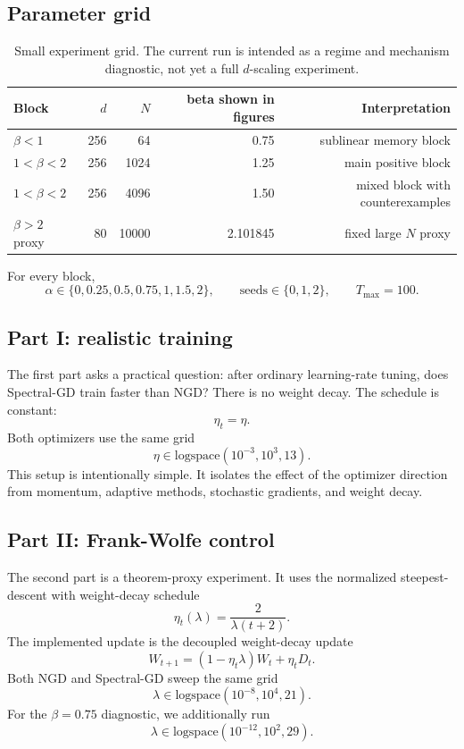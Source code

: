 \documentclass[11pt]{article}
\newcommand{\Tmax}{T_{\max}}
\begin{document}
\subsection{Parameter grid}

\begin{table}[H]
\centering
\caption{Small experiment grid. The current run is intended as a regime and mechanism diagnostic, not yet a full $d$-scaling experiment.}
\begin{tabular}{lrrrr}
\toprule
Block & $d$ & $N$ & beta shown in figures & Interpretation \\
\midrule
$\beta<1$ & 256 & 64 & 0.75 & sublinear memory block \\
$1<\beta<2$ & 256 & 1024 & 1.25 & main positive block \\
$1<\beta<2$ & 256 & 4096 & 1.50 & mixed block with counterexamples \\
$\beta>2$ proxy & 80 & 10000 & 2.101845 & fixed large $N$ proxy \\
\bottomrule
\end{tabular}
\end{table}

For every block,
\[
  \alpha\in\{0,0.25,0.5,0.75,1,1.5,2\},
  \qquad
  \mathrm{seeds}\in\{0,1,2\},
  \qquad
  \Tmax=100.
\]

\subsection{Part I: realistic training}

The first part asks a practical question: after ordinary learning-rate tuning, does Spectral-GD train faster than NGD? There is no weight decay. The schedule is constant:
\[
  \eta_t=\eta.
\]
Both optimizers use the same grid
\[
  \eta\in\mathrm{logspace}(10^{-3},10^3,13).
\]
This setup is intentionally simple. It isolates the effect of the optimizer direction from momentum, adaptive methods, stochastic gradients, and weight decay.

\subsection{Part II: Frank-Wolfe control}

The second part is a theorem-proxy experiment. It uses the normalized steepest-descent with weight-decay schedule
\[
  \eta_t(\lambda)=\frac{2}{\lambda(t+2)}.
\]
The implemented update is the decoupled weight-decay update
\[
  W_{t+1}
  =
  (1-\eta_t\lambda)W_t+\eta_tD_t.
\]
Both NGD and Spectral-GD sweep the same grid
\[
  \lambda\in\mathrm{logspace}(10^{-8},10^4,21).
\]
For the $\beta=0.75$ diagnostic, we additionally run
\[
  \lambda\in\mathrm{logspace}(10^{-12},10^2,29).
\]
\end{document}
